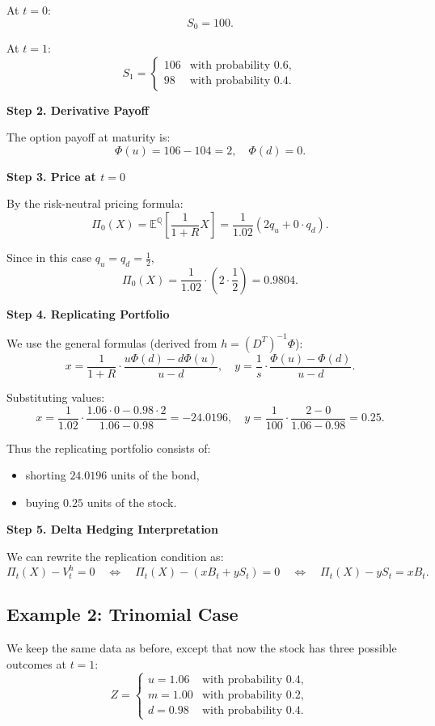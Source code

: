 \documentclass[12pt,a4paper]{article}
\theoremstyle{definition}
\newcommand{\Q}{\mathbb{Q}}
\newcommand{\E}{\mathbb{E}}
\begin{document}
At $t = 0$:
\[
S_0 = 100.
\]

At $t = 1$:
\[
S_1 = \begin{cases}
106 & \text{with probability } 0.6, \\
98 & \text{with probability } 0.4.
\end{cases}
\]

\textbf{Step 2. Derivative Payoff}

The option payoff at maturity is:
\[
\Phi(u) = 106 - 104 = 2, \quad \Phi(d) = 0.
\]

\textbf{Step 3. Price at $t = 0$}

By the risk-neutral pricing formula:
\[
\Pi_0(X) = \E^\Q\left[\frac{1}{1+R}X\right] = \frac{1}{1.02}(2q_u + 0 \cdot q_d).
\]

Since in this case $q_u = q_d = \frac{1}{2}$,
\[
\Pi_0(X) = \frac{1}{1.02} \cdot \left(2 \cdot \frac{1}{2}\right) = 0.9804.
\]

\textbf{Step 4. Replicating Portfolio}

We use the general formulas (derived from $h = (D^T)^{-1}\Phi$):
\[
x = \frac{1}{1+R} \cdot \frac{u\Phi(d) - d\Phi(u)}{u - d}, \quad y = \frac{1}{s} \cdot \frac{\Phi(u) - \Phi(d)}{u - d}.
\]

Substituting values:
\[
x = \frac{1}{1.02} \cdot \frac{1.06 \cdot 0 - 0.98 \cdot 2}{1.06 - 0.98} = -24.0196, \quad y = \frac{1}{100} \cdot \frac{2 - 0}{1.06 - 0.98} = 0.25.
\]

Thus the replicating portfolio consists of:
\begin{itemize}
\item shorting $24.0196$ units of the bond,
\item buying $0.25$ units of the stock.
\end{itemize}

\textbf{Step 5. Delta Hedging Interpretation}

We can rewrite the replication condition as:
\[
\Pi_t(X) - V_t^h = 0 \quad \Leftrightarrow \quad \Pi_t(X) - (xB_t + yS_t) = 0 \quad \Leftrightarrow \quad \Pi_t(X) - yS_t = xB_t.
\]

\subsection{Example 2: Trinomial Case}

We keep the same data as before, except that now the stock has three possible outcomes at $t = 1$:
\[
Z = \begin{cases}
u = 1.06 & \text{with probability } 0.4, \\
m = 1.00 & \text{with probability } 0.2, \\
d = 0.98 & \text{with probability } 0.4.
\end{cases}
\]
\end{document}
